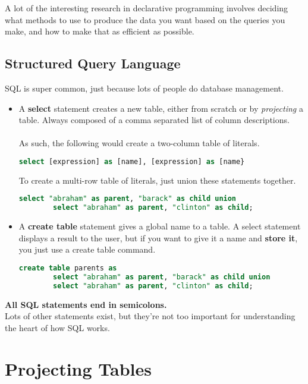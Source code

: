 \documentclass[12pt]{article}
\begin{document}
\begin{aside}
A lot of the interesting research in declarative programming involves deciding what methods to use to produce the data you want based on the queries you make, and how to make that as efficient as possible.
\end{aside}

\subsection{Structured Query Language}

SQL is super common, just because lots of people do database management.

\begin{itemize}
	\item A \textbf{select} statement creates a new table, either from scratch or by \textit{projecting} a table. Always composed of a comma separated list of column descriptions.\\\\
	As such, the following would create a two-column table of literals.
	\begin{lstlisting}[language=sql]
	    select [expression] as [name], [expression] as [name}\end{lstlisting}
	    To create a multi-row table of literals, just union these statements together.
	    \begin{lstlisting}[language=sql]
	    select "abraham" as parent, "barack" as child union
	    select "abraham" as parent, "clinton" as child;\end{lstlisting}
	\item A \textbf{create table} statement gives a global name to a table. A select statement displays a result to the user, but if you want to give it a name and \textbf{store it}, you just use a create table command.
	\begin{lstlisting}[language=sql]
	create table parents as
	    select "abraham" as parent, "barack" as child union
	    select "abraham" as parent, "clinton" as child;\end{lstlisting}
	 
\end{itemize}

\textbf{All SQL statements end in semicolons.}\\

Lots of other statements exist, but they're not too important for understanding the heart of how SQL works.

\section{Projecting Tables}
\end{document}
